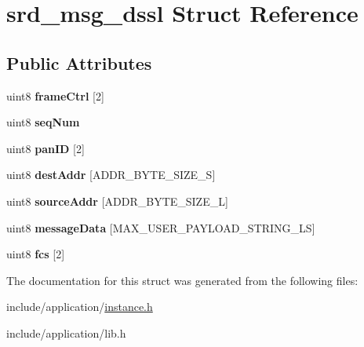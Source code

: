 \hypertarget{structsrd__msg__dssl}{\section{srd\-\_\-msg\-\_\-dssl Struct Reference}
\label{structsrd__msg__dssl}
}
\subsection*{Public Attributes}
\begin{DoxyCompactItemize}
\item 
\hypertarget{structsrd__msg__dssl_a3186120a4cae8d4b84097578125b84f4}{uint8 {\bfseries frame\-Ctrl} \mbox{[}2\mbox{]}}\label{structsrd__msg__dssl_a3186120a4cae8d4b84097578125b84f4}

\item 
\hypertarget{structsrd__msg__dssl_a07758e570b29c51dcfcc7b4c4ad89b71}{uint8 {\bfseries seq\-Num}}\label{structsrd__msg__dssl_a07758e570b29c51dcfcc7b4c4ad89b71}

\item 
\hypertarget{structsrd__msg__dssl_a29ad1278f02bd81f6bc7eb9db81b0802}{uint8 {\bfseries pan\-I\-D} \mbox{[}2\mbox{]}}\label{structsrd__msg__dssl_a29ad1278f02bd81f6bc7eb9db81b0802}

\item 
\hypertarget{structsrd__msg__dssl_a745c701a9e792db53661eaf313522053}{uint8 {\bfseries dest\-Addr} \mbox{[}A\-D\-D\-R\-\_\-\-B\-Y\-T\-E\-\_\-\-S\-I\-Z\-E\-\_\-\-S\mbox{]}}\label{structsrd__msg__dssl_a745c701a9e792db53661eaf313522053}

\item 
\hypertarget{structsrd__msg__dssl_a2252751a0e1a2d6cd48fcea8de5cb18f}{uint8 {\bfseries source\-Addr} \mbox{[}A\-D\-D\-R\-\_\-\-B\-Y\-T\-E\-\_\-\-S\-I\-Z\-E\-\_\-\-L\mbox{]}}\label{structsrd__msg__dssl_a2252751a0e1a2d6cd48fcea8de5cb18f}

\item 
\hypertarget{structsrd__msg__dssl_aa032afb19091f678fea235629cc4ed30}{uint8 {\bfseries message\-Data} \mbox{[}M\-A\-X\-\_\-\-U\-S\-E\-R\-\_\-\-P\-A\-Y\-L\-O\-A\-D\-\_\-\-S\-T\-R\-I\-N\-G\-\_\-\-L\-S\mbox{]}}\label{structsrd__msg__dssl_aa032afb19091f678fea235629cc4ed30}

\item 
\hypertarget{structsrd__msg__dssl_af1e462617c0e960c07945cb872706b0e}{uint8 {\bfseries fcs} \mbox{[}2\mbox{]}}\label{structsrd__msg__dssl_af1e462617c0e960c07945cb872706b0e}

\end{DoxyCompactItemize}


The documentation for this struct was generated from the following files\-:\begin{DoxyCompactItemize}
\item 
include/application/\hyperlink{instance_8h}{instance.\-h}\item 
include/application/lib.\-h\end{DoxyCompactItemize}

